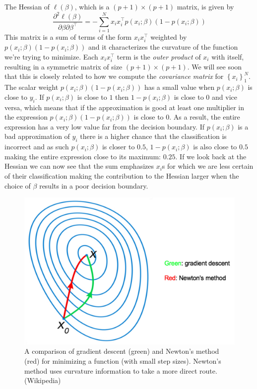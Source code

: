 \documentclass[a4paper]{article}
\begin{document}
The Hessian of $\ell(\beta)$, which is a $(p+1)\times(p+1)$ matrix, is given by
$$
\frac{\partial^2 \ell(\beta)}{\partial \beta\partial \beta^\top} = -\sum_{i=1}^N x_i x_i^\top p(x_i;\beta)\left(1-p(x_i;\beta)\right)
$$
This matrix is a sum of terms of the form $x_i x_i^\top$ weighted by $p(x_i;\beta)(1-p(x_i;\beta))$ and it characterizes the curvature of the function we're trying to minimize. Each $x_i x_i^\top$ term is the \textit{outer product} of $x_i$ with itself, resulting in a symmetric matrix of size $(p+1)\times(p+1)$.  We will see soon that this is closely related to how we compute the \emph{covariance matrix} for $\left\{x_i\right\}_1^N$. The scalar weight $p(x_i;\beta)(1-p(x_i;\beta))$ has a small value when $p(x_i;\beta)$ is close to $y_i$. If $p(x_i;\beta)$ is close to $1$ then $1 - p(x_i;\beta)$ is close to $0$ and vice versa, which means that if the approximation is good at least one multiplier in the expression $p(x_i;\beta)(1-p(x_i;\beta))$ is close to $0$. As a result, the entire expression has a very low value far from the decision boundary. If $p(x_i;\beta)$ is a bad approximation of $y_i$ there is a higher chance that the classification is incorrect and as such $p(x_i;\beta)$ is closer to $0.5$, $1 - p(x_i;\beta)$ is also close to $0.5$ making the entire expression close to its maximum: $0.25$. If we look back at the Hessian we can now see that the sum emphasizes $x_i$s for which we are less certain of their classification making the contribution to the Hessian  larger when the choice of $\beta$ results in a poor decision boundary. 

\begin{figure}
\centering
\includegraphics[width=1\textwidth]{Newton_s_Optimization.jpg}
\caption{A comparison of gradient descent (green) and Newton's method (red) for minimizing a function (with small step sizes). Newton's method uses curvature information to take a more direct route. (Wikipedia)}
\label{fig:newton3}
\end{figure}
\end{document}
